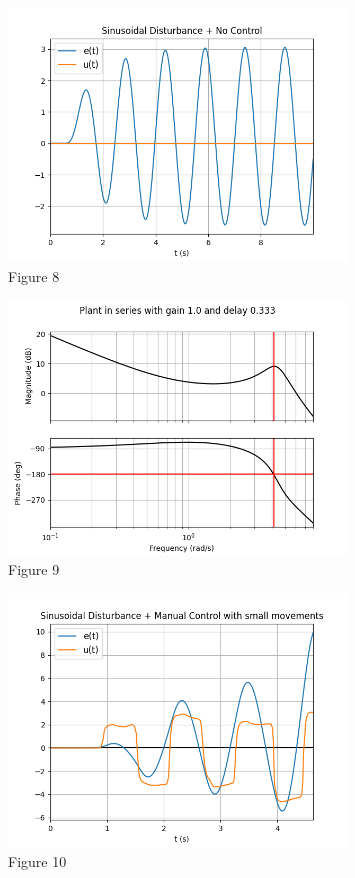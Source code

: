 \documentclass[8pt]{article}
\begin{document}
\newpage

\begin{figure}
    \centering
    \includegraphics[width=0.8\textwidth]{figures/FIGURE_8.png}
    \caption{Figure 8}
    \label{fig:figure8}
\end{figure}

\begin{figure}
    \centering
    \includegraphics[width=0.8\textwidth]{figures/FIGURE_9.png}
    \caption{Figure 9}
    \label{fig:figure9}
\end{figure}

\newpage

\begin{figure}
    \centering
    \includegraphics[width=0.8\textwidth]{figures/FIGURE_10.png}
    \caption{Figure 10}
    \label{fig:figure10}
\end{figure}
\end{document}
